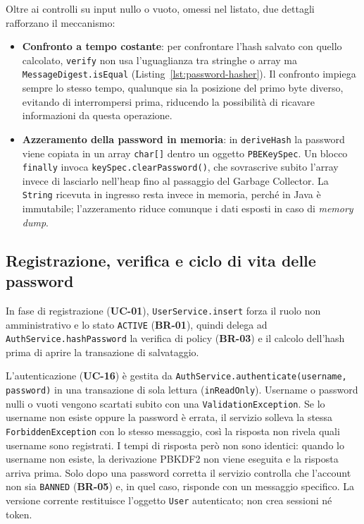 Oltre ai controlli su input nullo o vuoto, omessi nel listato, due dettagli rafforzano il meccanismo:

\begin{itemize}
    \item \textbf{Confronto a tempo costante}: per confrontare l'hash salvato con quello calcolato, \texttt{verify} non usa l'uguaglianza tra stringhe o array ma \texttt{MessageDigest.isEqual} (Listing~\ref{lst:password-hasher}). Il confronto impiega sempre lo stesso tempo, qualunque sia la posizione del primo byte diverso, evitando di interrompersi prima, riducendo la possibilità di ricavare informazioni da questa operazione.
    \item \textbf{Azzeramento della password in memoria}: in \texttt{deriveHash} la password viene copiata in un array \texttt{char[]} dentro un oggetto \texttt{PBEKeySpec}. Un blocco \texttt{finally} invoca \texttt{keySpec.clearPassword()}, che sovrascrive subito l'array invece di lasciarlo nell'heap fino al passaggio del Garbage Collector. La \texttt{String} ricevuta in ingresso resta invece in memoria, perché in Java è immutabile; l'azzeramento riduce comunque i dati esposti in caso di \textit{memory dump}.
\end{itemize}

\subsection{Registrazione, verifica e ciclo di vita delle password}
\label{sec:autenticazione-applicativa}

In fase di registrazione (\textbf{UC-01}), \texttt{UserService.insert} forza il ruolo non amministrativo e lo stato \texttt{ACTIVE} (\textbf{BR-01}), quindi delega ad \texttt{AuthService.hashPassword} la verifica di policy (\textbf{BR-03}) e il calcolo dell'hash prima di aprire la transazione di salvataggio.

L'autenticazione (\textbf{UC-16}) è gestita da \texttt{AuthService.authenticate(username, password)} in una transazione di sola lettura (\texttt{inReadOnly}). Username o password nulli o vuoti vengono scartati subito con una \texttt{ValidationException}. Se lo username non esiste oppure la password è errata, il servizio solleva la stessa \texttt{ForbiddenException} con lo stesso messaggio, così la risposta non rivela quali username sono registrati. I tempi di risposta però non sono identici: quando lo username non esiste, la derivazione PBKDF2 non viene eseguita e la risposta arriva prima. Solo dopo una password corretta il servizio controlla che l'account non sia \texttt{BANNED} (\textbf{BR-05}) e, in quel caso, risponde con un messaggio specifico. La versione corrente restituisce l'oggetto \texttt{User} autenticato; non crea sessioni né token.

